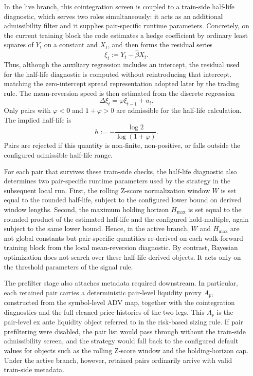 \documentclass[11pt,a4paper]{article}
\begin{document}
In the live branch, this cointegration screen is coupled to a train-side
half-life diagnostic, which serves two roles simultaneously: it acts as an
additional admissibility filter and it supplies pair-specific runtime
parameters. Concretely, on the current training block the code estimates a
hedge coefficient by ordinary least squares of \(Y_t\) on a constant and
\(X_t\), and then forms the residual series
\[
  \xi_t := Y_t - \widehat\beta X_t.
\]
Thus, although the auxiliary regression includes an intercept, the residual used
for the half-life diagnostic is computed without reintroducing that intercept,
matching the zero-intercept spread representation adopted later by the trading
rule. The mean-reversion speed is then estimated from the discrete regression
\[
  \Delta \xi_t = \varphi \xi_{t-1} + u_t.
\]
Only pairs with \(\varphi < 0\) and \(1+\varphi>0\) are admissible for the
half-life calculation. The implied half-life is
\[
  h := -\frac{\log 2}{\log(1+\varphi)}.
\]
Pairs are rejected if this quantity is non-finite, non-positive, or falls
outside the configured admissible half-life range.

For each pair that survives these train-side checks, the half-life diagnostic
also determines two pair-specific runtime parameters used by the strategy in
the subsequent local run. First, the rolling Z-score normalization window
\(W\) is set equal to the rounded half-life, subject to the configured lower
bound on derived window lengths. Second, the maximum holding horizon
\(H_{\max}\) is set equal to the rounded product of the estimated half-life and
the configured hold-multiple, again subject to the same lower bound. Hence, in
the active branch, \(W\) and \(H_{\max}\) are not global constants but
pair-specific quantities re-derived on each walk-forward training block from
the local mean-reversion diagnostic. By contrast, Bayesian optimization does
not search over these half-life-derived objects. It acts only on the threshold
parameters of the signal rule.

The prefilter stage also attaches metadata required downstream. In particular,
each retained pair carries a deterministic pair-level liquidity proxy
\(A_p\), constructed from the symbol-level ADV map, together with the
cointegration diagnostics and the full cleaned price histories of the two legs.
This \(A_p\) is the pair-level ex ante liquidity object referred to in the
risk-based sizing rule. If pair prefiltering were disabled, the pair list would
pass through without the train-side admissibility screen, and the strategy
would fall back to the configured default values for objects such as the
rolling Z-score window and the holding-horizon cap. Under the active branch,
however, retained pairs ordinarily arrive with valid train-side metadata.
\end{document}
